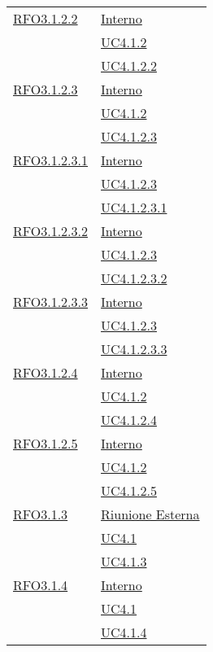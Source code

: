 \begin{longtable}{|>{\centering}m{5cm}|m{5cm}<{\centering}|}
\hyperlink{RFO3.1.2.2}{RFO3.1.2.2} &  \hyperlink{Interno}{Interno}\\ &\hyperref[UC4.1.2]{UC4.1.2}\\ &\hyperref[UC4.1.2.2]{UC4.1.2.2}\\ \hline

\hyperlink{RFO3.1.2.3}{RFO3.1.2.3} &  \hyperlink{Interno}{Interno}\\ &\hyperref[UC4.1.2]{UC4.1.2}\\ &\hyperref[UC4.1.2.3]{UC4.1.2.3}\\ \hline

\hyperlink{RFO3.1.2.3.1}{RFO3.1.2.3.1} &  \hyperlink{Interno}{Interno}\\ &\hyperref[UC4.1.2.3]{UC4.1.2.3}\\ &\hyperref[UC4.1.2.3.1]{UC4.1.2.3.1}\\ \hline

\hyperlink{RFO3.1.2.3.2}{RFO3.1.2.3.2} &  \hyperlink{Interno}{Interno}\\ &\hyperref[UC4.1.2.3]{UC4.1.2.3}\\ &\hyperref[UC4.1.2.3.2]{UC4.1.2.3.2}\\ \hline

\hyperlink{RFO3.1.2.3.3}{RFO3.1.2.3.3} &  \hyperlink{Interno}{Interno}\\ &\hyperref[UC4.1.2.3]{UC4.1.2.3}\\ &\hyperref[UC4.1.2.3.3]{UC4.1.2.3.3}\\ \hline

\hyperlink{RFO3.1.2.4}{RFO3.1.2.4} &  \hyperlink{Interno}{Interno}\\ &\hyperref[UC4.1.2]{UC4.1.2}\\ &\hyperref[UC4.1.2.4]{UC4.1.2.4}\\ \hline

\hyperlink{RFO3.1.2.5}{RFO3.1.2.5} &  \hyperlink{Interno}{Interno}\\ &\hyperref[UC4.1.2]{UC4.1.2}\\ &\hyperref[UC4.1.2.5]{UC4.1.2.5}\\ \hline

\hyperlink{RFO3.1.3}{RFO3.1.3} &  \hyperlink{Riunione Esterna}{Riunione Esterna}\\ &\hyperref[UC4.1]{UC4.1}\\ &\hyperref[UC4.1.3]{UC4.1.3}\\ \hline

\hyperlink{RFO3.1.4}{RFO3.1.4} &  \hyperlink{Interno}{Interno}\\ &\hyperref[UC4.1]{UC4.1}\\ &\hyperref[UC4.1.4]{UC4.1.4}\\ \hline


\end{longtable}
